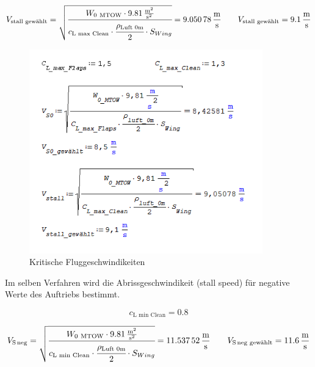 \begin{equation}
\label{eq:K6}
V_{\text{stall\ gewählt}} = \sqrt{\cfrac{W_{0\ \text{MTOW}} \cdot \SI[per-mode = fraction]{9,81}{\meter\squared\per\second\squared}}{c_{\text{L\ max\ Clean}} \cdot \cfrac{\rho_{\text{Luft\ 0m}}}{2} \cdot S_{Wing}}}=\SI[per-mode = fraction]{9,05078}{\meter\per\second} \qquad V_{\text{stall\ gewählt}}=\SI[per-mode = fraction]{9,1}{\meter\per\second}
\end{equation}

\begin{figure}[H]
\centering
\includegraphics[width=0.9\textwidth]{bilder/Formeln/Mindestbetriebsgeschwindikeit.png}
\caption{Kritische Fluggeschwindikeiten} 
\label{fig:Kritische Fluggeschwindikeiten}
\end{figure}

Im selben Verfahren wird die Abrissgeschwindikeit (stall speed) für negative Werte des Auftriebs bestimmt.

\begin{equation}
\label{eq:K7}
c_{\text{L\ min\ Clean}} = 0.8 
\end{equation}

\begin{equation}
\label{eq:K8}
V_{\text{S\,neg}} = \sqrt{\cfrac{W_{0\ \text{MTOW}} \cdot \SI[per-mode = fraction]{9,81}{\meter\squared\per\second\squared}}{c_{\text{L\ min\ Clean}} \cdot \cfrac{\rho_{\text{Luft\ 0m}}}{2} \cdot S_{Wing}}}=\SI[per-mode = fraction]{11,53752}{\meter\per\second} \qquad V_{\text{S\,neg\ gewählt}}=\SI[per-mode = fraction]{11,6}{\meter\per\second}
\end{equation}

